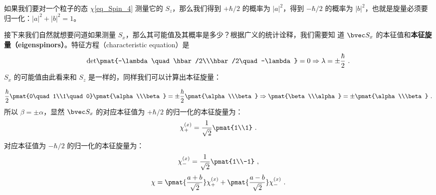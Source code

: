 如果我们要对一个粒子的态 $\chi$\autoref{eq_Spin_4} 测量它的 $S_z$，那么我们得到 $+\hbar/2$ 的概率为 $|a|^2$，得到 $-\hbar/2$ 的概率为 $|b|^2$，也就是旋量必须要归一化：$|a|^2+ |b|^2 = 1$。

接下来我们自然就想要问道如果测量 $S_x$，那么其可能值及其概率是多少？根据广义的统计诠释，我们需要知
道 $\bvec S_x$ 的本征值和\textbf{本征旋量（eigenspinors）}。特征方程（characteristic equation）是
\begin{equation}
\rm{det}\pmat{-\lambda \quad \hbar/2\\\hbar/2\quad -\lambda}=0\Rightarrow\lambda=\pm\frac{\hbar}{2}~.
\end{equation}
$S_x$ 的可能值由此看来和 $S_z$ 是一样的，同样我们可以计算出本征旋量：

\begin{equation}
\frac{\hbar}{2}\pmat{0\quad 1\\1\quad0}\pmat{\alpha\\\beta}=\pm\frac{\hbar}{2}\pmat{\alpha\\\beta} \Rightarrow \pmat{\beta\\\alpha}=\pm\pmat{\alpha\\\beta}~.
\end{equation}
所以 $\beta=\pm\alpha$，显然 $\bvec S_x$ 的对应本征值为 $+\hbar/2$ 的归一化的本征旋量为：
\begin{equation}\label{eq_Spin_5}
\chi_+^{(x)}=\frac{1}{\sqrt{2}}\pmat{1\\1}~.
\end{equation}
对应本征值为 $-\hbar/2$ 的归一化的本征旋量为：
\begin{equation}\label{eq_Spin_6}
\chi_-^{(x)}=\frac{1}{\sqrt{2}}\pmat{1\\-1}~,
\end{equation}
\begin{equation}
\chi = \pmat{\frac{a+b}{\sqrt{2}}}\chi_+^{(x)}+\pmat{\frac{a-b}{\sqrt{2}}}\chi_-^{(x)}~.
\end{equation}

